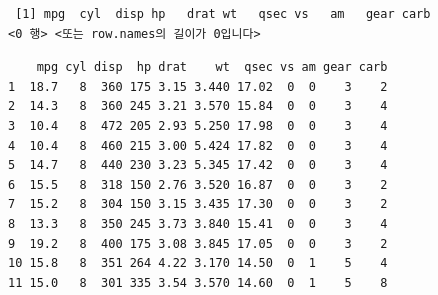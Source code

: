 \documentclass[
  11pt,
]{krantz}
\newenvironment{Shaded}{\begin{snugshade}}{\end{snugshade}}
\newcommand{\CommentTok}[1]{\textcolor[rgb]{0.37,0.37,0.37}{\textit{#1}}}
\newcommand{\DecValTok}[1]{\textcolor[rgb]{0.06,0.06,0.06}{#1}}
\newcommand{\KeywordTok}[1]{\textcolor[rgb]{0.27,0.27,0.27}{\textbf{#1}}}
\newcommand{\NormalTok}[1]{#1}
\newcommand{\OperatorTok}[1]{\textcolor[rgb]{0.43,0.43,0.43}{\textbf{#1}}}
\newcommand{\StringTok}[1]{\textcolor[rgb]{0.5,0.5,0.5}{#1}}
\begin{document}
\footnotesize

\begin{Shaded}
\end{Shaded}

\begin{verbatim}
 [1] mpg  cyl  disp hp   drat wt   qsec vs   am   gear carb
<0 행> <또는 row.names의 길이가 0입니다>
\end{verbatim}

\begin{Shaded}
\end{Shaded}

\begin{verbatim}
    mpg cyl disp  hp drat    wt  qsec vs am gear carb
1  18.7   8  360 175 3.15 3.440 17.02  0  0    3    2
2  14.3   8  360 245 3.21 3.570 15.84  0  0    3    4
3  10.4   8  472 205 2.93 5.250 17.98  0  0    3    4
4  10.4   8  460 215 3.00 5.424 17.82  0  0    3    4
5  14.7   8  440 230 3.23 5.345 17.42  0  0    3    4
6  15.5   8  318 150 2.76 3.520 16.87  0  0    3    2
7  15.2   8  304 150 3.15 3.435 17.30  0  0    3    2
8  13.3   8  350 245 3.73 3.840 15.41  0  0    3    4
9  19.2   8  400 175 3.08 3.845 17.05  0  0    3    2
10 15.8   8  351 264 4.22 3.170 14.50  0  1    5    4
11 15.0   8  301 335 3.54 3.570 14.60  0  1    5    8
\end{verbatim}

\begin{Shaded}
\end{Shaded}
\end{document}
